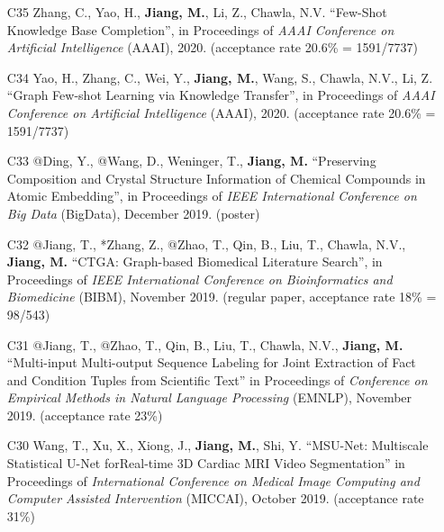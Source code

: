 \documentclass[10pt]{article}
\newenvironment{myindentpar}[1]%
{\begin{list}{}%
         {\setlength{\leftmargin}{#1}}%
         \item[]%
}
{\end{list}}
\newcounter{list}
\newcommand{\hide}[1]{}
\begin{document}
\begin{myindentpar}{0.00cm}
\begin{enumerate}[leftmargin=.5cm]
\item[C35] Zhang, C., Yao, H., \textbf{Jiang, M.}, Li, Z., Chawla, N.V. ``Few-Shot Knowledge Base Completion'', in Proceedings of \textit{AAAI Conference on Artificial Intelligence} (AAAI), 2020. (acceptance rate 20.6\% = 1591/7737)

\item[C34] Yao, H., Zhang, C., Wei, Y., \textbf{Jiang, M.}, Wang, S., Chawla, N.V., Li, Z. ``Graph Few-shot Learning via Knowledge Transfer'', in Proceedings of \textit{AAAI Conference on Artificial Intelligence} (AAAI), 2020. (acceptance rate 20.6\% = 1591/7737)

\item[C33] @Ding, Y., @Wang, D., Weninger, T., \textbf{Jiang, M.} ``Preserving Composition and Crystal Structure Information of Chemical Compounds in Atomic Embedding'', in Proceedings of \textit{IEEE International Conference on Big Data} (BigData), December 2019. (poster)

\item[C32] @Jiang, T., *Zhang, Z., @Zhao, T., Qin, B., Liu, T., Chawla, N.V., \textbf{Jiang, M.} ``CTGA: Graph-based Biomedical Literature Search'', in Proceedings of \textit{IEEE International Conference on Bioinformatics and Biomedicine} (BIBM), November 2019. (regular paper, acceptance rate 18\% = 98/543)

	\hide{\vspace{-0.1cm}\hspace{0.5cm}{\small \emph{I made 20\% contribution and Mr. Jiang made 60\%. I conceived the idea. Mr. Jiang implemented the system, did the experiments, and wrote the paper.}}}

\item[C31] @Jiang, T., @Zhao, T., Qin, B., Liu, T., Chawla, N.V., \textbf{Jiang, M.} ``Multi-input Multi-output Sequence Labeling for Joint Extraction of Fact and Condition Tuples from Scientific Text'' in Proceedings of \textit{Conference on Empirical Methods in Natural Language Processing} (EMNLP), November 2019. (acceptance rate 23\%)

	\hide{\vspace{-0.1cm}\hspace{0.5cm}{\small \emph{I made 30\% contribution and Mr. Jiang made 60\%. I conceived the idea. Mr. Jiang designed the study, implemented the system, and did the experiments. I wrote the introduction. Mr. Jiang wrote the rest of the paper.}}}

\item[C30] Wang, T., Xu, X., Xiong, J., \textbf{Jiang, M.}, Shi, Y. ``MSU-Net: Multiscale Statistical U-Net forReal-time 3D Cardiac MRI Video Segmentation'' in Proceedings of \textit{International Conference on Medical Image Computing and Computer Assisted Intervention} (MICCAI), October 2019. (acceptance rate 31\%)		
	\hide{\vspace{-0.1cm}\hspace{0.5cm}{\small \emph{I made 5\% contribution. I joined the discussions, re-wrote the introduction section, and reviewed the rest of the paper.}}}


\end{enumerate}
\end{myindentpar}
\end{document}
